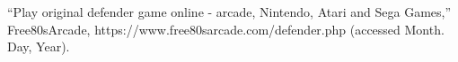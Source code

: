 \begin{thebibliography}{00}
 “Play original defender game online - arcade, Nintendo, Atari and Sega Games,” Free80sArcade, https://www.free80sarcade.com/defender.php (accessed Month. Day, Year). 
\end{thebibliography}